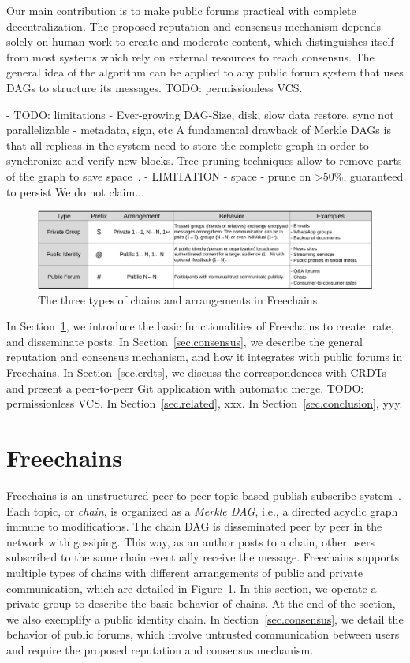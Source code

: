 \documentclass[10pt,journal,compsoc]{IEEEtran}
\newcommand{\FC}       {Freechains\xspace}
\begin{document}
Our main contribution is to make public forums practical with complete
decentralization.
The proposed reputation and consensus mechanism depends solely on human work to
create and moderate content, which distinguishes itself from most systems which
rely on external resources to reach consensus.
The general idea of the algorithm can be applied to any public forum system
that uses DAGs to structure its messages.
TODO: permissionless VCS.

- TODO: limitations
    - Ever-growing DAG-Size, disk, slow data restore, sync not parallelizable
    - metadata, sign, etc
A fundamental drawback of Merkle DAGs is that all replicas in the system need
to store the complete graph in order to synchronize and verify new blocks.
Tree pruning techniques allow to remove parts of the graph to save
space~\cite{p2p.prune}.
- LIMITATION
    - space
    - prune on >50\%, guaranteed to persist
We do not claim...

\begin{figure}
\centering
\includegraphics[width=\textwidth]{arrangements.png}
\caption{The three types of chains and arrangements in \FC.}
\label{fig.table}
\end{figure}

In Section~\ref{sec.freechains}, we introduce the basic functionalities of \FC
to create, rate, and disseminate posts.
In Section~\ref{sec.consensus}, we describe the general reputation and
consensus mechanism, and how it integrates with public forums in \FC.
In Section~\ref{sec.crdts}, we discuss the correspondences with CRDTs and
present a peer-to-peer Git application with automatic merge.
TODO: permissionless VCS.
In Section~\ref{sec.related}, xxx.
In Section~\ref{sec.conclusion}, yyy.

\section{Freechains}
\label{sec.freechains}

\FC is an unstructured peer-to-peer topic-based publish-subscribe
system~\cite{fcs.sbseg20}.
Each topic, or \emph{chain}, is organized as a \emph{Merkle DAG}, i.e., a
directed acyclic graph immune to modifications.
The chain DAG is disseminated peer by peer in the network with gossiping.
This way, as an author posts to a chain, other users subscribed to the same
chain eventually receive the message.
\FC supports multiple types of chains with different arrangements of public and
private communication, which are detailed in Figure~\ref{fig.table}.
In this section, we operate a private group to describe the basic behavior of
chains.
At the end of the section, we also exemplify a public identity chain.
In Section~\ref{sec.consensus}, we detail the behavior of public forums, which
involve untrusted communication between users and require the proposed
reputation and consensus mechanism.
\end{document}
